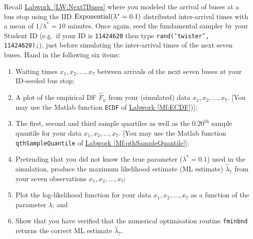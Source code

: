 \begin{labwork}\label{LW:ExponentialBusMLE}
Recall \hyperref[LW:Next7Buses]{Labwork~\ref*{LW:Next7Buses}} where you modeled the arrival of buses at a bus stop using the IID $\mbox{{\rm Exponential}}(\lambda^*=0.1)$ distributed inter-arrival times with a mean of $1/\lambda^*=10$ minutes.  Once again, seed the fundamental sampler by your Student ID (e.g.~if your ID is {\tt 11424620} then type {\tt rand('twister', 11424620);}), just before simulating the inter-arrival times of the next seven buses.  Hand in the following six items:
\begin{enumerate}
\item Waiting times $x_1,x_2,\ldots,x_7$ between arrivals of the next seven buses at your ID-seeded bus stop;
\item A plot of the empirical DF $\widehat{F}_n$  from your (simulated) data $x_1,x_2,\ldots,x_7$.  [You may use the {\sc Matlab} function {\tt ECDF} of  \hyperref[Mf:ECDF]{Labwork \ref*{Mf:ECDF}})];
\item The first, second and third sample quartiles as well as the $0.20^{\text{th}}$ sample quantile for your data $x_1,x_2,\ldots,x_7$.  [You may use the {\sc Matlab} function {\tt qthSampleQuantile} of \hyperref[Mf:qthSampleQuantile]{Labwork \ref*{Mf:qthSampleQuantile}}];
\item Pretending that you did not know the true parameter ($\lambda^*=0.1$) used in the simulation, produce the maximum likelihood estimate (ML estimate) $\widehat{\lambda}_7$ from your seven observations $x_1,x_2,\ldots,x_7$;
\item Plot the log-likelihood function for your data $x_1,x_2,\ldots,x_7$ as a function of the parameter $\lambda$; and
\item Show that you have verified that the numerical optimisation routine {\tt fminbnd} returns the correct ML estimate $\widehat{\lambda}_7$.
\end{enumerate}
 \end{labwork}
 
